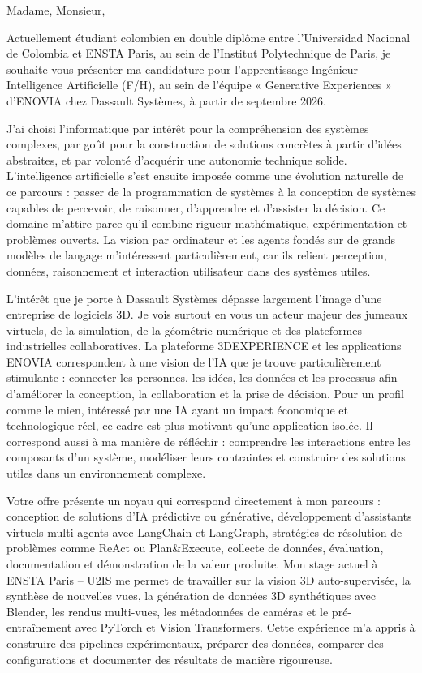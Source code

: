 \documentclass[10pt,a4paper]{article}
\begin{document}
{\small

Madame, Monsieur,

Actuellement étudiant colombien en double diplôme entre l’Universidad Nacional de Colombia et ENSTA Paris, au sein de l’Institut Polytechnique de Paris, je souhaite vous présenter ma candidature pour l’apprentissage Ingénieur Intelligence Artificielle (F/H), au sein de l’équipe « Generative Experiences » d’ENOVIA chez Dassault Systèmes, à partir de septembre 2026.

J’ai choisi l’informatique par intérêt pour la compréhension des systèmes complexes, par goût pour la construction de solutions concrètes à partir d’idées abstraites, et par volonté d’acquérir une autonomie technique solide. L’intelligence artificielle s’est ensuite imposée comme une évolution naturelle de ce parcours : passer de la programmation de systèmes à la conception de systèmes capables de percevoir, de raisonner, d’apprendre et d’assister la décision. Ce domaine m’attire parce qu’il combine rigueur mathématique, expérimentation et problèmes ouverts. La vision par ordinateur et les agents fondés sur de grands modèles de langage m’intéressent particulièrement, car ils relient perception, données, raisonnement et interaction utilisateur dans des systèmes utiles.

L’intérêt que je porte à Dassault Systèmes dépasse largement l’image d’une entreprise de logiciels 3D. Je vois surtout en vous un acteur majeur des jumeaux virtuels, de la simulation, de la géométrie numérique et des plateformes industrielles collaboratives. La plateforme 3DEXPERIENCE et les applications ENOVIA correspondent à une vision de l’IA que je trouve particulièrement stimulante : connecter les personnes, les idées, les données et les processus afin d’améliorer la conception, la collaboration et la prise de décision. Pour un profil comme le mien, intéressé par une IA ayant un impact économique et technologique réel, ce cadre est plus motivant qu’une application isolée. Il correspond aussi à ma manière de réfléchir : comprendre les interactions entre les composants d’un système, modéliser leurs contraintes et construire des solutions utiles dans un environnement complexe.

Votre offre présente un noyau qui correspond directement à mon parcours : conception de solutions d’IA prédictive ou générative, développement d’assistants virtuels multi-agents avec LangChain et LangGraph, stratégies de résolution de problèmes comme ReAct ou Plan\&Execute, collecte de données, évaluation, documentation et démonstration de la valeur produite. Mon stage actuel à ENSTA Paris – U2IS me permet de travailler sur la vision 3D auto-supervisée, la synthèse de nouvelles vues, la génération de données 3D synthétiques avec Blender, les rendus multi-vues, les métadonnées de caméras et le pré-entraînement avec PyTorch et Vision Transformers. Cette expérience m’a appris à construire des pipelines expérimentaux, préparer des données, comparer des configurations et documenter des résultats de manière rigoureuse.

}
\end{document}
